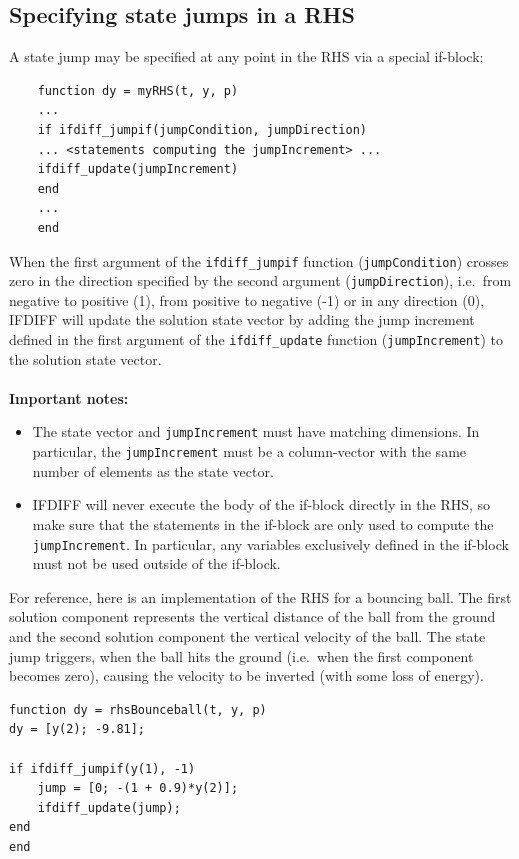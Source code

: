 \subsection*{Specifying state jumps in a RHS}
A state jump may be specified at any point in the RHS via a special if-block:
\begin{lstlisting}
	function dy = myRHS(t, y, p)
	...
	if ifdiff_jumpif(jumpCondition, jumpDirection)
	... <statements computing the jumpIncrement> ...
	ifdiff_update(jumpIncrement)
	end
	...
	end
\end{lstlisting}
When the first argument of the \lstinline|ifdiff_jumpif| function (\lstinline|jumpCondition|) crosses zero in the direction specified by the second argument (\lstinline|jumpDirection|), i.e.~from negative to positive (1), from positive to negative (-1) or in any direction (0), IFDIFF will update the solution state vector by adding the jump increment defined in the first argument of the \lstinline|ifdiff_update| function (\lstinline|jumpIncrement|) to the solution state vector. \\\\
\textbf{Important notes:}
\begin{itemize}
	\item The state vector and \lstinline|jumpIncrement| must have matching dimensions. In particular, the \lstinline|jumpIncrement| must be a column-vector with the same number of elements as the state vector.
	\item IFDIFF will never execute the body of the if-block directly in the RHS, so make sure that the statements in the if-block are only used to compute the \verb|jumpIncrement|. In particular, any variables exclusively defined in the if-block must not be used outside of the if-block.
\end{itemize}
For reference, here is an implementation of the RHS for a bouncing ball. The first solution component represents the vertical distance of the ball from the ground and the second solution component the vertical velocity of the ball. The state jump triggers, when the ball hits the ground (i.e.~when the first component becomes zero), causing the velocity to be inverted (with some loss of energy).
\begin{lstlisting}
function dy = rhsBounceball(t, y, p)
dy = [y(2); -9.81];

if ifdiff_jumpif(y(1), -1)
    jump = [0; -(1 + 0.9)*y(2)];
    ifdiff_update(jump);
end
end
\end{lstlisting} 
